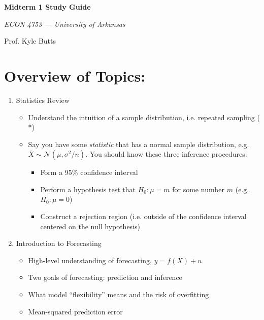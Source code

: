 \documentclass[12pt]{article}
\begin{document}
\begin{center}
  {\Huge\bf Midterm 1 Study Guide}
  
  \smallskip
  {\large\it  ECON 4753 — University of Arkansas}

  \medskip
  {\large Prof. Kyle Butts}
\end{center}

\section*{Overview of Topics:}
\begin{enumerate}
  \item[1.] Statistics Review
  \begin{itemize}
    \item Understand the intuition of a sample distribution, i.e. repeated sampling ($*$)

    \item Say you have some \emph{statistic} that has a normal sample distribution, e.g. $\bar{X} \sim \mathcal{N}(\mu, \sigma^2 / n)$. You should know these three inference procedures:
    \begin{itemize}
      \item Form a 95\% confidence interval
      
      \item Perform a hypothesis test that $H_0: \mu = m$ for some number $m$ (e.g. $H_0: \mu = 0$)
      
      \item Construct a rejection region (i.e. outside of the confidence interval centered on the null hypothesis)
    \end{itemize} 
  \end{itemize}

  \vspace{5mm}
  \item[2.] Introduction to Forecasting
  \begin{itemize}
    \item High-level understanding of forecasting, $y = f(X) + u$
    
    \item Two goals of forecasting: prediction and inference
    
    \item What model ``flexibility'' means and the risk of overfitting
    
    \item Mean-squared prediction error 
    

\end{itemize}
\end{enumerate}
\end{document}
